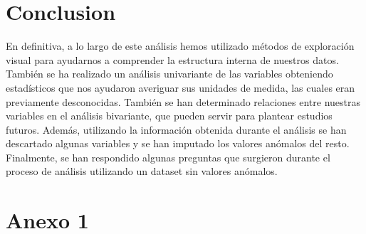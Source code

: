\documentclass[notspecified,article,submit,moreauthors,pdftex]{Definitions/mdpi}
\begin{document}
\hypertarget{conclusion}{%
\section{Conclusion}\label{conclusion}}

En definitiva, a lo largo de este análisis hemos utilizado métodos de
exploración visual para ayudarnos a comprender la estructura interna de
nuestros datos. También se ha realizado un análisis univariante de las
variables obteniendo estadísticos que nos ayudaron averiguar sus
unidades de medida, las cuales eran previamente desconocidas. También se
han determinado relaciones entre nuestras variables en el análisis
bivariante, que pueden servir para plantear estudios futuros. Además,
utilizando la información obtenida durante el análisis se han descartado
algunas variables y se han imputado los valores anómalos del resto.
Finalmente, se han respondido algunas preguntas que surgieron durante el
proceso de análisis utilizando un dataset sin valores anómalos.

\hypertarget{Anexo}{%
\section{Anexo 1}\label{Anexo}}
\end{document}
